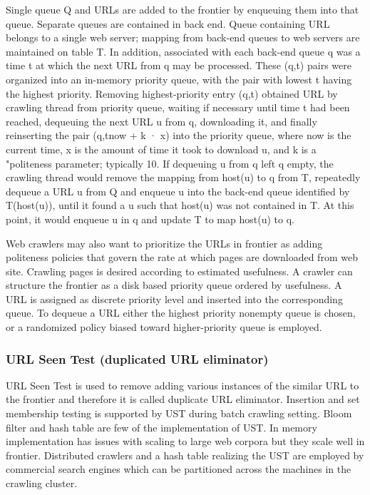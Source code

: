 \documentclass[article,type=msc,colorback,accentcolor=tud9c,twoside,11pt]{tudthesis}
\begin{document}
Single queue Q and URLs are added to the frontier by enqueuing them into that queue. Separate queues are contained in back end. Queue containing URL belongs to a single web server; mapping from back-end queues to web servers are maintained on table T. In addition, associated with each back-end queue q was a time t at which the next URL from q may be processed. These (q,t) pairs were organized into an in-memory priority queue, with the pair with lowest t having the highest priority.  Removing highest-priority entry (q,t) obtained URL by crawling thread from priority queue, waiting if necessary until time t had been reached, dequeuing the next URL u from q, downloading it, and finally reinserting the pair (q,tnow + k · x) into the priority queue, where now is the current time, x is the amount of time it took to download u, and k is a "politeness parameter; typically 10. If dequeuing u from q left q empty, the crawling thread would remove the mapping from host(u) to q from T, repeatedly dequeue a URL u from Q and enqueue u into the back-end queue identified by T(host(u)), until it found a u such that host(u) was not contained in T. At this point, it would enqueue u in q and update T to map host(u) to q.

Web crawlers may also want to prioritize the URLs in  frontier as adding politeness policies that govern the rate at which pages are downloaded from web site. Crawling pages is desired according to estimated usefulness. A crawler can structure the frontier as a disk based priority queue ordered by usefulness. A URL is assigned as discrete priority level and inserted into the corresponding queue. To dequeue a URL either the highest priority nonempty queue is chosen, or a randomized policy biased toward higher-priority queue is employed.

\subsubsection{URL Seen Test (duplicated URL eliminator)}
URL Seen Test is used to remove adding various instances of the similar URL to the frontier and therefore it is called duplicate URL eliminator. Insertion and set membership testing is supported by UST during batch crawling setting. Bloom filter and hash table are few of the implementation of UST. In memory implementation has issues with scaling to large web corpora but they scale well in frontier. Distributed crawlers and a hash table realizing the UST are employed by commercial search engines which can be partitioned across the machines in the crawling cluster.
\end{document}
